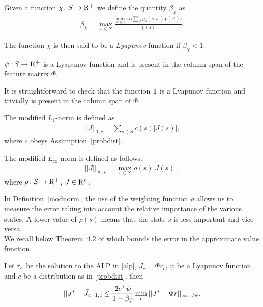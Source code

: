 \begin{definition}
Given a function $\chi\colon S\rightarrow \mathrm{R}^+$ we define the quantity $\beta_{\chi}$ as
\begin{align}
\beta_{\chi}=\max_{s \in S} \frac{\underset{a \in A}{\max}\big(\alpha\sum_{s'}p_a(s,s')\chi(s')\big)}{\chi(s)}.
\end{align}
\end{definition}
\begin{definition}
The function $\chi$ is then said to be a \emph{Lyapunov} function if $\beta_{\chi}<1$.
\end{definition}
\begin{assumption}\label{lyap}
$\psi\colon S \rightarrow \mathrm{R}^+$ is a Lyapunov function and is present in the column span of the feature matrix $\Phi$.
\end{assumption}
It is straightforward to check that the function $\mathbf{1}$ is a Lyapunov function and trivially is present in the column span of $\Phi$. 
\begin{definition}\label{modlone}
The modified $L_1$-norm is defined as
\begin{align}
||J||_{1,c}=\sum_{s \in S} c(s)|J(s)|,
\end{align}
where $c$ obeys Assumption~\ref{probdist}.
\end{definition}
\begin{definition}\label{modnorm}
The modified $L_\infty$-norm is defined as follows:
\begin{align}
||J||_{\infty,\rho}=\max_{s \in S} \rho(s) |J(s)|,
\end{align}
where $\rho \colon \mathcal{S} \rightarrow \mathrm{R}^+$, $J\in \mathrm{R}^n$.
\end{definition}
In Definition~\ref{modnorm}, the use of the weighting function $\rho$ allows us to measure the error taking into account the relative importance of the various states. A lower value of $\rho(s)$ means that the state $s$ is less important and vice-versa.\\
We recall below Theorem~$4.2$ of \cite{ALP} which bounds the error in the approximate value function.
\begin{theorem}\label{restateval}
Let $\tilde{r}_c$ be the solution to the ALP in \eqref{alp}, $\tilde{J}_c=\Phi \tilde{r}_c$, $\psi$ be a Lyapunov function and $c$ be a distribution as in \eqref{probdist}, then 
\begin{align}
||J^*-\tilde{J}_c||_{1,c}\leq \frac{2c^\top \psi}{1-\beta_{\psi}}\min_{r}||J^*-\Phi r||_{\infty,1/\psi}.
\end{align}
\end{theorem}
